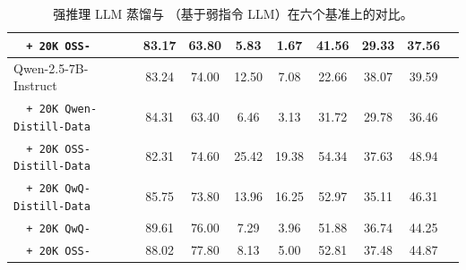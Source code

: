 \begin{table}[t]
{\begin{tabular}{lcccccccc}
  \texttt{\ \ + 20K OSS-\method{}} & 83.17 & 63.80 & 5.83 & 1.67 & 41.56 & 29.33 & 37.56 \\
  \midrule
  Qwen-2.5-7B-Instruct & 83.24 & 74.00 & 12.50 & 7.08 & 22.66 & 38.07 & 39.59 \\
  \texttt{\ \ + 20K Qwen-Distill-Data} & 84.31 & 63.40 & 6.46 & 3.13 & 31.72 & 29.78 & 36.46 \\
  \texttt{\ \ + 20K OSS-Distill-Data} & 82.31 & 74.60 & 25.42 & 19.38 & 54.34 & 37.63 & 48.94 \\
  \texttt{\ \ + 20K QwQ-Distill-Data} & 85.75 & 73.80 & 13.96 & 16.25 & 52.97 & 35.11 & 46.31 \\
  \texttt{\ \ + 20K QwQ-\method{}} & 89.61 & 76.00 & 7.29 & 3.96 & 51.88 & 36.74 & 44.25 \\
  \texttt{\ \ + 20K OSS-\method{}} & 88.02 & 77.80 & 8.13 & 5.00 & 52.81 & 37.48 & 44.87 \\
\bottomrule
\end{tabular}
}
\caption{强推理 LLM 蒸馏与 \method（基于弱指令 LLM）在六个基准上的对比。}
\label{tab:full_method_result}
\end{table}

\begin{table}[t]
\centering
{}
\caption{不同指令 LLM 作为 \method 合成器的有效性分析。}
\label{tab:different_llm_method}
\end{table}

